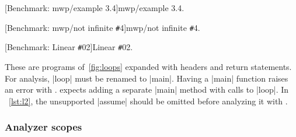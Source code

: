 \begin{center}
\begin{minipage}[t]{.47\textwidth}
\captionsetup{type=lstlisting}
[Benchmark: mwp/example 3.4]{mwp/example 3.4.}
\label{lst:ex34}
\end{minipage}\hfill
\begin{minipage}[t]{.50\textwidth}
\captionsetup{type=lstlisting}
[Benchmark: mwp/not infinite \texttt{\#}4]{mwp/not infinite \texttt{\#}4.}
\label{lst:ni4}
\end{minipage}
\end{center}%
\begin{center}
\begin{minipage}[t]{.50\textwidth}
\captionsetup{type=lstlisting}
[Benchmark: Linear \texttt{\#}02]{Linear \texttt{\#}02.}
\label{lst:l2}
\end{minipage}
\end{center}

These are programs of~\autoref{fig:loops} expanded with headers and return statements.
For  analysis, \pr|loop| must be renamed to \pr|main|.
Having a \pr|main| function raises an error with \@.
 expects adding a separate \pr|main| method with calls to \pr|loop|.
In ~\autoref{lst:l2}, the unsupported \pr|assume| should be omitted before analyzing it with \@.

\subsubsection{Analyzer scopes}\label{subsec:analyzer-scopes}

